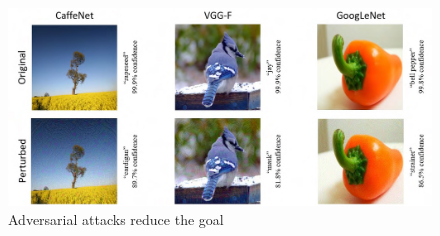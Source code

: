 \begin{figure}[H] \center
    \includegraphics[scale=.5]{./figures/story-1-1.jpg}
    \caption{Adversarial attacks reduce the goal\cite{akhtar_threat_2018}}
    \label{fig:goal-reduction}
\end{figure}\

